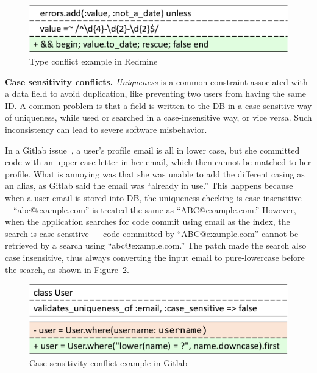 \begin{figure}
    \centering
    \includegraphics[width=0.6\columnwidth]{constraints/figs/redmine-9394-tooloose.pdf}
    \caption{Type conflict example in Redmine}
    \label{fig:redmine-9394-tooloose}
\end{figure}

\textbf{Case sensitivity conflicts.} 
{\it Uniqueness} is a common constraint associated with a data field to
avoid duplication, like preventing two users from having the same ID. 
A common problem is that a field is written to the DB in
a case-sensitive way of uniqueness, while used or searched in a
case-insensitive way, or vice versa. Such inconsistency can lead to severe software misbehavior. 

In a Gitlab issue~\cite{gitlab-24493}, a user's profile email is all in lower case, but she committed code with an upper-case letter in her email, which then cannot
be matched to her profile. What is annoying was that she was 
unable to add the different casing as an alias, as Gitlab said
the email was ``already in use.''  This happens because when a user-email is stored into DB, the uniqueness checking
is case insensitive---``abc@example.com'' is treated the same as ``ABC@example.com.'' However, when the application searches for code commit using email
as the index, the search is case sensitive --- code committed by
``ABC@example.com'' cannot be retrieved by a search using
``abc@example.com.'' The patch made the search also
case insensitive, thus always converting the input email to pure-lowercase before the
search, as shown in Figure~\ref{fig:gitlabcasesensitive}. 

\begin{figure}
    \centering
    \includegraphics[width=0.6\columnwidth]{constraints/figs/gitlab-issue.pdf}
    \caption{Case sensitivity conflict example in Gitlab}
    \label{fig:gitlabcasesensitive}
\end{figure}


